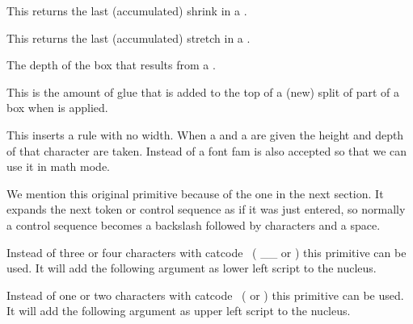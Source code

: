 \stopnewprimitive

\startnewprimitive[title={\prm {splitlastshrink}}]

This returns the last (accumulated) shrink in a .

\stopnewprimitive

\startnewprimitive[title={\prm {splitlaststretch}}]

This returns the last (accumulated) stretch in a .

\stopnewprimitive

\startoldprimitive[title={\prm {splitmaxdepth}}]

The depth of the box that results from a .

\stopoldprimitive

\startoldprimitive[title={\prm {splittopskip}}]

This is the amount of glue that is added to the top of a (new) split of part of a
box when  is applied.

\stopoldprimitive

\startnewprimitive[title={\prm {srule}}]

This inserts a rule with no width. When a  and a  are
given the height and depth of that character are taken. Instead of a font \type
{fam} is also accepted so that we can use it in math mode.

\stopnewprimitive

\startoldprimitive[title={\prm {string}}]

We mention this original primitive because of the one in the next section. It
expands the next token or control sequence as if it was just entered, so normally
a control sequence becomes a backslash followed by characters and a space.

\stopoldprimitive

\startnewprimitive[title={\prm {subprescript}}]

Instead of three or four characters with catcode \the\subscriptcatcode\ (\type
{__} or \type {____}) this primitive can be used. It will add the following
argument as lower left script to the nucleus.

\stopnewprimitive

\startnewprimitive[title={\prm {subscript}}]

Instead of one or two characters with catcode \the\superscriptcatcode\ (\type {_}
or \type {__}) this primitive can be used. It will add the following argument as
upper left script to the nucleus.

